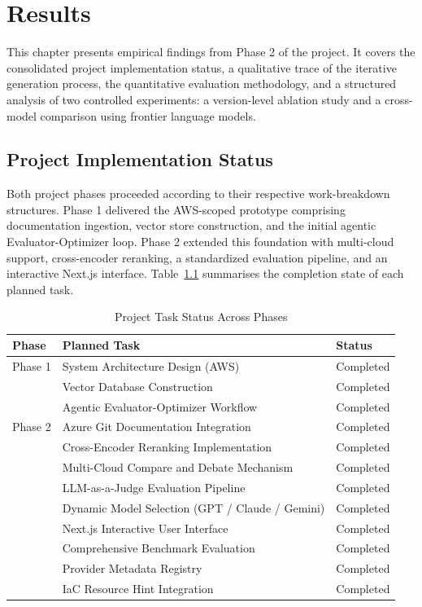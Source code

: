 \chapter{Results}

This chapter presents empirical findings from Phase 2 of the project. It covers the consolidated project implementation status, a qualitative trace of the iterative generation process, the quantitative evaluation methodology, and a structured analysis of two controlled experiments: a version-level ablation study and a cross-model comparison using frontier language models.

\section{Project Implementation Status}

Both project phases proceeded according to their respective work-breakdown structures. Phase 1 delivered the AWS-scoped prototype comprising documentation ingestion, vector store construction, and the initial agentic Evaluator-Optimizer loop. Phase 2 extended this foundation with multi-cloud support, cross-encoder reranking, a standardized evaluation pipeline, and an interactive Next.js interface. Table~\ref{tab:project_status} summarises the completion state of each planned task.

\begin{table}[h]
    \centering
    \caption{Project Task Status Across Phases}
    \label{tab:project_status}
    \begin{tabular}{@{}lll@{}}
        \toprule
        \textbf{Phase} & \textbf{Planned Task} & \textbf{Status} \\
        \midrule
        Phase 1 & System Architecture Design (AWS) & Completed \\
                & Vector Database Construction      & Completed \\
                & Agentic Evaluator-Optimizer Workflow & Completed \\
        \midrule
        Phase 2 & Azure Git Documentation Integration   & Completed \\
                & Cross-Encoder Reranking Implementation & Completed \\
                & Multi-Cloud Compare and Debate Mechanism & Completed \\
                & LLM-as-a-Judge Evaluation Pipeline     & Completed \\
                & Dynamic Model Selection (GPT / Claude / Gemini) & Completed \\
                & Next.js Interactive User Interface     & Completed \\
                & Comprehensive Benchmark Evaluation     & Completed \\
                & Provider Metadata Registry             & Completed \\
                & IaC Resource Hint Integration          & Completed \\
        \bottomrule
    \end{tabular}
\end{table}


